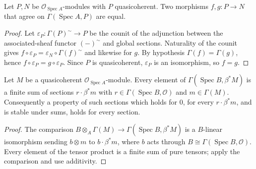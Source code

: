 \begin{lemma}
\label{lem:kn-affine-qcoh-hom-ext-top}
\leanok
Let $P,N$ be $\mathcal O_{\operatorname{Spec}A}$-modules with $P$ quasicoherent. Two
morphisms $f,g:P\to N$ that agree on $\Gamma(\operatorname{Spec}A,P)$ are equal.
\end{lemma}
\begin{proof}
Let $\varepsilon_P:\Gamma(P)^\sim\to P$ be the counit of the adjunction between the
associated-sheaf functor $(-)^\sim$ and global sections. Naturality of the counit gives
$f\circ\varepsilon_P=\varepsilon_N\circ\Gamma(f)^\sim$ and likewise for $g$. By hypothesis
$\Gamma(f)=\Gamma(g)$, hence $f\circ\varepsilon_P=g\circ\varepsilon_P$. Since $P$ is
quasicoherent, $\varepsilon_P$ is an isomorphism, so $f=g$.
\end{proof}

\begin{lemma}
\label{lem:kn-affine-pullback-top-generation}
\leanok
Let $M$ be a quasicoherent $\mathcal O_{\operatorname{Spec}A}$-module. Every element of
$\Gamma(\operatorname{Spec}B,\beta^*M)$ is a finite sum of sections $r\cdot\beta^*m$ with
$r\in\Gamma(\operatorname{Spec}B,\mathcal O)$ and $m\in\Gamma(M)$. Consequently a property
of such sections which holds for $0$, for every $r\cdot\beta^*m$, and is stable under sums,
holds for every section.
\end{lemma}
\begin{proof}
The comparison $B\otimes_A\Gamma(M)\to\Gamma(\operatorname{Spec}B,\beta^*M)$ is a
$B$-linear isomorphism sending $b\otimes m$ to $b\cdot\beta^*m$, where $b$ acts through
$B\cong\Gamma(\operatorname{Spec}B,\mathcal O)$. Every element of the tensor product is a
finite sum of pure tensors; apply the comparison and use additivity.
\end{proof}

